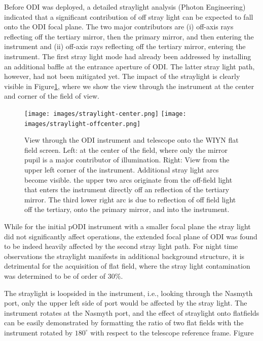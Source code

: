 \documentclass[draft]{spieman}
\begin{document}
Before ODI was deployed, a detailed straylight analysis (Photon Engineering)
indicated that a significant contribution of off stray light can be expected to
fall onto the ODI focal plane. The two major contributors are (i) off-axis rays
reflecting off the tertiary mirror, then the primary mirror, and then entering
the instrument and (ii) off-axis rays reflecting off the tertiary mirror,
entering the instrument. The first stray light mode had already been addressed
by installing an additional baffle at the entrance aperture of ODI. The latter
stray light path, however, had not been mitigated yet. The impact of the
straylight is clearly visible in Figure\ref{fig_straylight}, where we show the
view through the instrument at the center and corner of the field of view.


\begin{figure}[h]
	\texttt{[image: images/straylight-center.png]}
	\texttt{[image: images/straylight-offcenter.png]}
	\caption{\label{fig_straylight} View through the ODI instrument and telescope
		onto the WIYN flat field screen. Left: at the center of the field, where only
		the mirror pupil is a major contributor of illumination. Right: View from the
		upper left corner of the instrument. Additional stray light arcs become visible.
		the upper two arcs originate from the off-field light that enters the instrument
		directly off an reflection of the tertiary mirror. The third lower right arc is 
		due to reflection of off field light off the tertiary, onto the primary mirror,
		and  into the instrument. } 
\end{figure}


While for the initial pODI instrument with a smaller focal plane the stray
light did not significantly affect operations, the extended focal plane of
ODI was found to be indeed heavily affected by the second stray light path.
For night time observations the straylight manifests in additional
background structure, it is detrimental for the acquisition of flat field,
where the stray light contamination was determined to be of order of 30\%.

The straylight is loopsided in the instrument, i.e., looking through the
Nasmyth port, only the upper left side of port would be affected by the
stray light. The instrument rotates at the Nasmyth port, and the effect of
straylight onto flatfields can be easily demonstrated by formatting the ratio
of two flat fields with the instrument rotated by $180^\circ$ with respect
to the telescope reference frame. Figure \label{fig_flatfieldbaffle}
\end{document}
